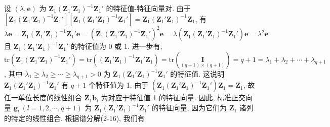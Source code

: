 设 $(\lambda,\mathbf{e})$ 为 $\mathbf{Z}_1(\mathbf{Z}_1'\mathbf{Z}_1)^{-1}\mathbf{Z}_1'$ 的特征值-特征向量对. 由于 $[\mathbf{Z}_1(\mathbf{Z}_1'\mathbf{Z}_1)^{-1}\mathbf{Z}_1'][\mathbf{Z}_1(\mathbf{Z}_1'\mathbf{Z}_1)^{-1}\mathbf{Z}_1']=\mathbf{Z}_1(\mathbf{Z}_1'\mathbf{Z}_1)^{-1}\mathbf{Z}_1$, 有
\[
\lambda\mathbf{e}=\mathbf{Z}_1(\mathbf{Z}_1'\mathbf{Z}_1)^{-1}\mathbf{Z}_1'\mathbf{e}
=(\mathbf{Z}_1(\mathbf{Z}_1'\mathbf{Z}_1)^{-1}\mathbf{Z}_1')^2\mathbf{e}
=\lambda(\mathbf{Z}_1(\mathbf{Z}_1'\mathbf{Z}_1)^{-1}\mathbf{Z}_1')\mathbf{e}=\lambda^2\mathbf{e}
\]
且 $\mathbf{Z}_1(\mathbf{Z}_1'\mathbf{Z}_1)^{-1}\mathbf{Z}_1'$ 的特征值为 0 或 1. 进一步有, $\mathrm{tr}(\mathbf{Z}_1(\mathbf{Z}_1'\mathbf{Z}_1)^{-1}\mathbf{Z}_1')=\mathrm{tr}((\mathbf{Z}_1'\mathbf{Z}_1)^{-1}\mathbf{Z}_1'\mathbf{Z}_1)=\mathrm{tr}(\underset{(q+1)\times(q+1)}{\mathbf{I}})=q+1=\lambda_1+\lambda_2+\cdots+\lambda_{q+1}$, 其中 $\lambda_1\geqslant\lambda_2\geqslant\cdots\geqslant\lambda_{q+1}>0$ 为 $\mathbf{Z}_1(\mathbf{Z}_1'\mathbf{Z}_1)^{-1}\mathbf{Z}_1'$ 的特征值. 这说明 $\mathbf{Z}_1(\mathbf{Z}_1'\mathbf{Z}_1)^{-1}\mathbf{Z}_1'$ 有 $q+1$ 个特征值为 1. 由于 $(\mathbf{Z}_1(\mathbf{Z}_1'\mathbf{Z}_1)^{-1}\mathbf{Z}_1')\mathbf{Z}_1=\mathbf{Z}_1$, 故任一单位长度的线性组合 $\mathbf{Z}_1\mathbf{b}_l$ 为对应于特征值 1 的特征向量. 因此, 标准正交向量 $\mathbf{g}_l\ (l=1,2,\cdots,q+1)$ 为 $\mathbf{Z}_1(\mathbf{Z}_1'\mathbf{Z}_1)^{-1}\mathbf{Z}_1'$ 的特征向量, 因为它们为 $\mathbf{Z}_1$ 诸列的特定的线性组合. 根据谱分解(2-16), 我们有
